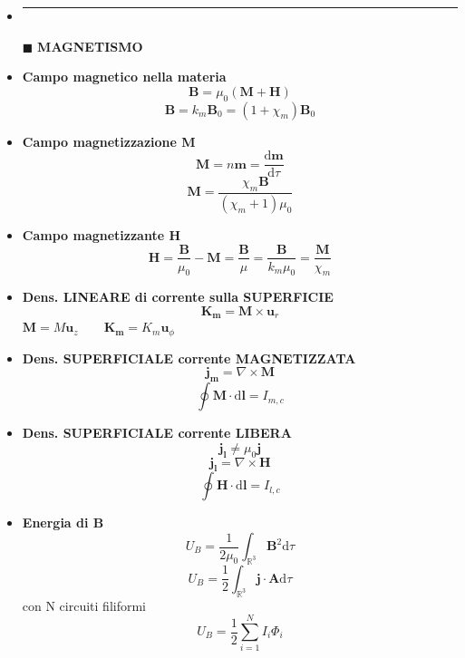 \documentclass{book}
\newcommand{\g}{\textbf}
\newcommand{\h}{\mathbf}
\newcommand{\e}{\begin{equation}}
\newcommand{\ex}{\end{equation} }
\renewcommand{\it}{\item[$\cdot$]}
\newcommand{\sep}{\item[]\rule{\linewidth}{0.4pt}}
\begin{document}
\begin{multicols}{4}
\begin{itemize}
\sep
\item [$\blacksquare$] \g{MAGNETISMO}
    \it \g{Campo magnetico nella materia}
        \e{\h{B}=\mu_0(\h{M}+\h{H})} \ex
        \e{\h{B}=k_m\h{B}_0=(1+\chi_m)\h{B}_0} \ex
    \it \g{Campo magnetizzazione M}
        \e{\h{M}=n\h{m}=\frac{\mathrm{d}\h{m}}{\mathrm{d}\tau}} \ex
        \e{\h{M}=\frac{\chi_m \h{B}}{(\chi_m+1)\mu_0}} \ex
    \it \g{Campo magnetizzante H}
        \e{\h{H}=\frac{\h{B}}{\mu_0}-\h{M}=\frac{\h{B}}{\mu}=\frac{\h{B}}{k_m\mu_0}=\frac{\h{M}}{\chi_m}} \ex
    \it \g{Dens. LINEARE di corrente sulla SUPERFICIE}
        \e{\h{K_m}=\h{M}\times\h{u}_r} \ex
        $\h{M}=M\h{u}_z \qquad \h{K_m}=K_m\h{u}_\phi$ \\
    \it \g{Dens. SUPERFICIALE corrente MAGNETIZZATA}
        \e{\h{j_m}=\nabla\times\h{M}} \ex
        \e{\oint\h{M}\cdot\mathrm{d}\h{{l}}=I_{m,c}} \ex
    \it \g{Dens. SUPERFICIALE corrente LIBERA}
        \e{\h{j_l}\neq\mu_0\h{j}} \ex
        \e{\h{j_l}=\nabla\times\h{H}} \ex
        \e{\oint\h{H}\cdot\mathrm{d}\h{l}=I_{l,c}} \ex
    \it \g{Energia di B}
        \e{ U_B=\frac{1}{2 \mu_{0}} \int_{\mathbb{R}^3} \h{B}^{2} \mathrm{d}\tau }\ex
        \e{U_B=\frac{1}{2}\int_{\mathbb{R}^3}\h{j}\cdot\h{A}\mathrm{d}\tau} \ex
        con N circuiti filiformi
        \e{U_B=\frac{1}{2}\sum_{i=1}^N I_i\Phi_i} \ex


\end{itemize}
\end{multicols}
\end{document}
